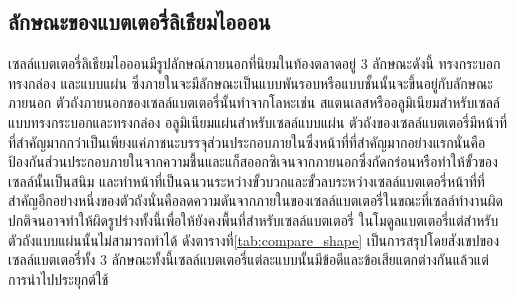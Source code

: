 \subsection{ลักษณะของแบตเตอรี่ลิเธียมไอออน}
เซลล์แบตเตอรี่ลิเธียมไอออนมีรูปลักษณ์ภายนอกที่นิยมในท้องตลาดอยู่ 3 ลักษณะดังนี้ ทรงกระบอก ทรงกล่อง และแบบแผ่น ซึ่งภายในจะมีลักษณะเป็นแบบพันรอบหรือแบบชั้นนั้นจะขึ้นอยู่กับลักษณะภายนอก
ตัวถังภายนอกของเซลล์แบตเตอรี่นั้นทำจากโลหะเช่น สแตนเลสหรืออลูมิเนียมสำหรับเซลล์แบบทรงกระบอกและทรงกล่อง อลูมิเนียมแผ่นสำหรับเซลล์แบบแผ่น ตัวถังของเซลล์แบตเตอรี่มีหน้าที่ที่สำคัญมากกว่าเป็นเพียงแค่ภาชนะบรรจุส่วนประกอบภายในซึ่งหน้าที่ที่สำคัญมากอย่างแรกนั่นคือป้องกันส่วนประกอบภายในจากความชื้นและแก็สออกซิเจนจากภายนอกซึ่งกัดกร่อนหรือทำให้ขั้วของเซลล์นั้นเป็นสนิม
และทำหน้าที่เป็นฉนวนระหว่างขั้วบวกและขั้วลบระหว่างเซลล์แบตเตอรี่หน้าที่ที่สำคัญอีกอย่างหนึ่งของตัวถังนั่นคือลดความดันจากภายในของเซลล์แบตเตอรี่ในขณะที่เซลล์ทำงานผิดปกติจนอาจทำให้ผิดรูปร่างทั้งนี้เพื่อให้ยังคงพื้นที่สำหรับเซลล์แบตเตอรี่
ในโมดูลแบตเตอรี่แต่สำหรับตัวถังแบบแผ่นนั้นไม่สามารถทำได้
\newline\hspace*{2cm} ดังตารางที่\ref{tab:compare_shape} เป็นการสรุปโดยสังเขปของเซลล์แบตเตอรี่ทั้ง 3 ลักษณะทั้งนี้เซลล์แบตเตอรี่แต่ละแบบนั้นมีข้อดีและข้อเสียแตกต่างกันแล้วแต่การนำไปประยุกต์ใช้
